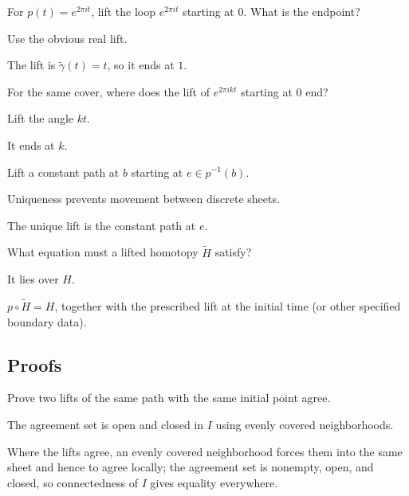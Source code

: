 \begin{exercise}\label{exr:viii11-ped-02}
For $p(t)=e^{2\pi it}$, lift the loop $e^{2\pi it}$ starting at $0$. What is the endpoint?
\end{exercise}
\begin{hint}
Use the obvious real lift.
\end{hint}
\begin{solution}
The lift is $\widetilde\gamma(t)=t$, so it ends at $1$.
\end{solution}

\begin{exercise}\label{exr:viii11-ped-03}
For the same cover, where does the lift of $e^{2\pi i kt}$ starting at $0$ end?
\end{exercise}
\begin{hint}
Lift the angle $kt$.
\end{hint}
\begin{solution}
It ends at $k$.
\end{solution}

\begin{exercise}\label{exr:viii11-ped-04}
Lift a constant path at $b$ starting at $e\in p^{-1}(b)$.
\end{exercise}
\begin{hint}
Uniqueness prevents movement between discrete sheets.
\end{hint}
\begin{solution}
The unique lift is the constant path at $e$.
\end{solution}

\begin{exercise}\label{exr:viii11-ped-05}
What equation must a lifted homotopy $\widetilde H$ satisfy?
\end{exercise}
\begin{hint}
It lies over $H$.
\end{hint}
\begin{solution}
$p\circ\widetilde H=H$, together with the prescribed lift at the initial time (or other specified boundary data).
\end{solution}

\subsection*{Proofs}

\begin{exercise}\label{exr:viii11-ped-06}
Prove two lifts of the same path with the same initial point agree.
\end{exercise}
\begin{hint}
The agreement set is open and closed in $I$ using evenly covered neighborhoods.
\end{hint}
\begin{solution}
Where the lifts agree, an evenly covered neighborhood forces them into the same sheet and hence to agree locally; the agreement set is nonempty, open, and closed, so connectedness of $I$ gives equality everywhere.
\end{solution}

